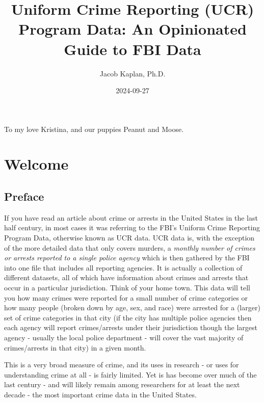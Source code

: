 \documentclass[
]{krantz}
\title{Uniform Crime Reporting (UCR) Program Data: An
Opinionated Guide to FBI Data}
\author{Jacob Kaplan, Ph.D.}
\date{2024-09-27}
\begin{document}
\maketitle

\thispagestyle{empty}
\begin{center}
To my love Kristina, and our puppies Peanut and Moose.
\end{center}

\setlength{\abovedisplayskip}{-5pt}
\setlength{\abovedisplayshortskip}{-5pt}

{
\hypersetup{linkcolor=}
\setcounter{tocdepth}{2}
\tableofcontents
}
\mainmatter

\part{Welcome}\label{part-welcome}

\chapter{Preface}\label{preface}

If you have read an article about crime or arrests in the
United States in the last half century, in most cases it was
referring to the FBI's Uniform Crime Reporting Program Data,
otherwise known as UCR data. UCR data is, with the exception
of the more detailed data that only covers murders, a
\emph{monthly number of crimes or arrests reported to a
single police agency} which is then gathered by the FBI into
one file that includes all reporting agencies. It is
actually a collection of different datasets, all of which
have information about crimes and arrests that occur in a
particular jurisdiction. Think of your home town. This data
will tell you how many crimes were reported for a small
number of crime categories or how many people (broken down
by age, sex, and race) were arrested for a (larger) set of
crime categories in that city (if the city has multiple
police agencies then each agency will report crimes/arrests
under their jurisdiction though the largest agency - usually
the local police department - will cover the vast majority
of crimes/arrests in that city) in a given month.

This is a very broad measure of crime, and its uses in
research - or uses for understanding crime at all - is
fairly limited. Yet is has become over much of the last
century - and will likely remain among researchers for at
least the next decade - the most important crime data in the
United States.
\end{document}
